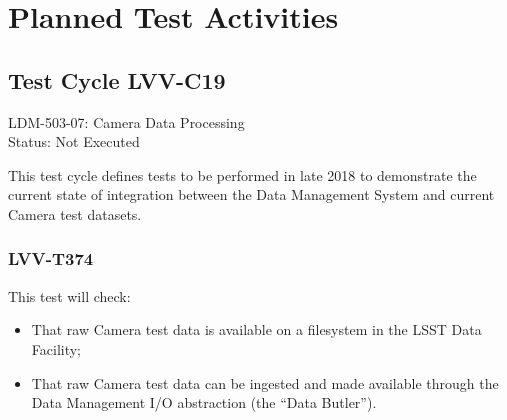 \documentclass[DM,lsstdraft,STR,toc]{lsstdoc}
\providecommand{\tightlist}{
  \setlength{\itemsep}{0pt}\setlength{\parskip}{0pt}}
\begin{document}
\newpage
\section{Planned Test Activities}
\label{sect:plannedtestactivities}


\subsection{Test Cycle LVV-C19}

LDM-503-07: Camera Data Processing\\
Status: Not Executed


This test cycle defines tests to be performed in late 2018 to
demonstrate the current state of integration between the Data Management
System and current Camera test datasets.



\subsubsection{LVV-T374}

This test will check:

\begin{itemize}
\tightlist
\item
  That raw Camera test data is available on a filesystem in the LSST
  Data Facility;
\item
  That raw Camera test data can be ingested and made available through
  the Data Management I/O abstraction (the ``Data Butler'').
\end{itemize}
\end{document}
